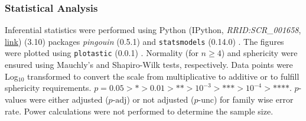 \subsubsection*{Statistical Analysis}%
\label{C1:methods_statistics}%
Inferential statistics were performed using Python (IPython,
\textit{RRID:SCR\_001658},
\href{https://www.ncbi.nlm.nih.gov/sra?term=SCR_001658}{link}) (3.10) packages
\textit{pingouin} (0.5.1) and \texttt{statsmodels} (0.14.0)
\cite{vallatPingouinStatisticsPython2018,seaboldStatsmodelsEconometricStatistical2010}.
The figures were plotted using \texttt{plotastic} (0.0.1)
\cite{kuricPlotasticBridgingPlotting2024}. Normality (for \( n \geq 4 \)) and
sphericity were ensured using Mauchly's and Shapiro-Wilk tests, respectively.
Data points were Log\(_{10}\) transformed to convert the scale from
multiplicative to additive or to fulfill sphericity requirements. \( p = 0.05 >
\text{*} > 0.01 > \text{**} > 10^{-3} > \text{***}> 10^{-4} > \text{****} \).
$p$-values were either adjusted (\( p{\text{-adj}} \)) or not adjusted (\(
p{\text{-unc}} \)) for family wise error rate. Power calculations were not
performed to determine the sample size.



